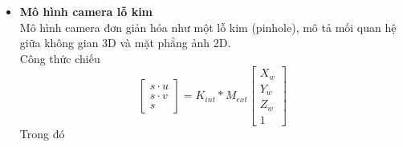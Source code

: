           \begin{itemize}
               \item \textbf{Mô hình camera lỗ kim}\\
               \hspace*{0.6cm}Mô hình camera đơn giản hóa như một lỗ kim (pinhole), mô tả mối quan hệ giữa không gian 3D và mặt phẳng ảnh 2D.\\
               \hspace*{0.6cm}Công thức chiếu
                    \begin{equation}
                         \begin{bmatrix}
                              s \cdot u \\
                              s \cdot v \\
                              s
                              \end{bmatrix}
                              = K_{int} \ast M_{ext}
                              \begin{bmatrix}
                              X_w \\
                              Y_w \\
                              Z_w \\
                              1
                         \end{bmatrix}
                    \end{equation}
               \hspace*{0.6cm}Trong đó
\end{itemize}
